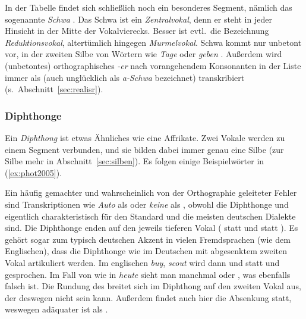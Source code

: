 In der Tabelle findet sich schließlich noch ein besonderes Segment, nämlich das sogenannte \textit{Schwa} \textipa{[@]}.
Das Schwa ist ein \textit{Zentralvokal}, denn er steht in jeder Hinsicht in der Mitte der Vokalvierecks.
Besser ist evtl.\ die Bezeichnung \textit{Reduktionsvokal}, altertümlich hingegen \textit{Murmelvokal}.
Schwa kommt nur unbetont vor, \zB in der zweiten Silbe von Wörtern wie \textit{Tage} \textipa{[ta:g@]} oder \textit{geben} \textipa{[ge:b@n]}.
Außerdem wird (unbetontes) orthographisches \textit{-er} nach vorangehendem Konsonanten in der Liste immer als \textipa{[5]} (auch unglücklich als \textit{a-Schwa} bezeichnet) transkribiert (s.\ Abschnitt~\ref{sec:realisr}).

\subsubsection{Diphthonge}

\label{sec:diphthonge}


Ein \textit{Diphthong} ist etwas Ähnliches wie eine Affrikate.
Zwei Vokale werden zu einem Segment verbunden, und sie bilden dabei immer genau eine Silbe (zur Silbe mehr in Abschnitt~\ref{sec:silben}).
Es folgen einige Beispielwörter in (\ref{ex:phot2005}).

\begin{exe}
  \ex\label{ex:phot2005}
  \begin{xlist}
  \end{xlist}
\end{exe}

Ein häufig gemachter und wahrscheinlich von der Orthographie geleiteter Fehler sind Transkriptionen wie \textit{Auto} als \Ast\textipa{[P\t{aU}to]} oder \textit{keine} als \Ast\textipa{[k\t{aI}ne]}, obwohl die Diphthonge \textipa{[\t{aE}]} und \textipa{[\t{aO}]} eigentlich charakteristisch für den Standard und die meisten deutschen Dialekte sind.
Die Diphthonge enden auf den jeweils tieferen Vokal (\textipa{[O]} statt \textipa{[U]} und \textipa{[E]} statt \textipa{[I]}).
Es gehört sogar zum typisch deutschen Akzent in vielen Fremdsprachen (wie \zB dem Englischen), dass die Diphthonge wie im Deutschen mit abgesenktem zweiten Vokal artikuliert werden.
Im englischen \textit{buy}, \textit{scout} wird dann \textipa{[b\t{aE}]} und \textipa{[sk\t{aO}t]} statt \textipa{[b\t{aI}]} und \textipa{[sk\t{aU}t]} gesprochen.
Im Fall von \textipa{[\t{O\oe}]} wie in \textit{heute} \textipa{[h\t{O\oe}t@]} sieht man manchmal \textipa{[\t{OI}]} oder \textipa{[\t{OY}]}, was ebenfalls falsch ist.
Die Rundung des \textipa{[o]} breitet sich im Diphthong auf den zweiten Vokal aus, der deswegen nicht \textipa{[I]} sein kann.
Außerdem findet auch hier die Absenkung statt, weswegen \textipa{[\t{O\oe}]} adäquater ist als \textipa{[\t{OY}]}.

